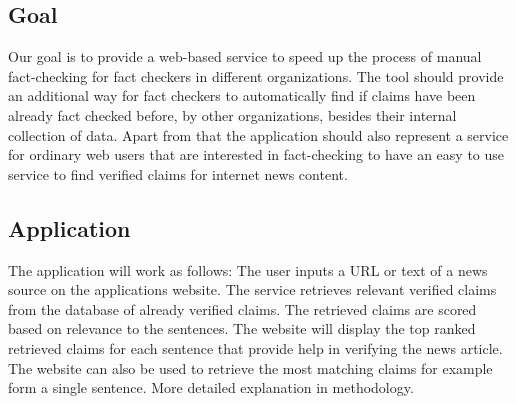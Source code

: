 \documentclass{article}
\begin{document}
\subsection{Goal}
Our goal is to provide a web-based service to speed up the process of manual fact-checking for fact checkers in different organizations. 
The tool should provide an additional way for fact checkers to automatically find if claims have been already fact checked before, by other organizations, besides their internal collection of data.
Apart from that the application should also represent a service for ordinary web users that are interested in fact-checking to have an easy to use service to find verified claims for internet news content. 
\subsection{Application}
The application will work as follows:
The user inputs a URL or text of a news source on the applications website.
The service retrieves relevant verified claims from the database of already verified claims.
The retrieved claims are scored based on relevance to the sentences.
The website will display the top ranked retrieved claims for each sentence that provide help in verifying the news article.
The website can also be used to retrieve the most matching claims for example form a single sentence.
More detailed explanation in methodology.



\end{document}
